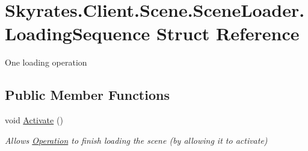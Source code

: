 \hypertarget{struct_skyrates_1_1_client_1_1_scene_1_1_scene_loader_1_1_loading_sequence}{\section{Skyrates.\-Client.\-Scene.\-Scene\-Loader.\-Loading\-Sequence Struct Reference}
\label{struct_skyrates_1_1_client_1_1_scene_1_1_scene_loader_1_1_loading_sequence}
}


One loading operation  


\subsection*{Public Member Functions}
\begin{DoxyCompactItemize}
\item 
void \hyperlink{struct_skyrates_1_1_client_1_1_scene_1_1_scene_loader_1_1_loading_sequence_a583e4562aabb398170effb32853ee6e3}{Activate} ()
\begin{DoxyCompactList}\small\item\em Allows \hyperlink{struct_skyrates_1_1_client_1_1_scene_1_1_scene_loader_1_1_loading_sequence_a6505c988f53074f64b4f1dcd49d58396}{Operation} to finish loading the scene (by allowing it to activate) \end{DoxyCompactList}\end{DoxyCompactItemize}
